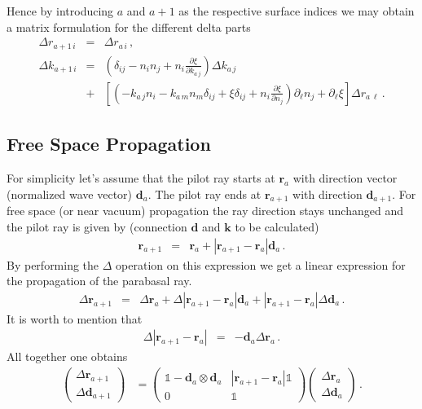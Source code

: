 \documentclass[12pt,a4paper,twoside,openright,BCOR10mm,headsepline,titlepage,abstracton,chapterprefix,final]{scrreprt}
\newcommand\Vector[1]{{\mathbf{#1}}}
\newcommand\wavenumber{k}
\begin{document}
Hence by introducing $a$ and $a+1$ as the respective surface indices we may obtain a matrix formulation for the different delta parts
\begin{eqnarray}
 \Delta r_{a+1\,i} &=& \Delta r_{a\,i}\,,\\
 \Delta \wavenumber_{a+1\,i} &=& 
   \left( \delta_{ij}  - n_i n_j + n_i \frac{\partial \xi}{\partial \wavenumber_{a\,j}}\right) \Delta\wavenumber_{a\,j} \nonumber\\
   &+&
   \left[
      \left(
     - \wavenumber_{a\,j}  n_i 
     - \wavenumber_{a\,m} n_m \delta_{ij}  
     + \xi \delta_{ij}
     + n_i \frac{\partial \xi}{\partial n_j}
    \right) \partial_\ell n_j + \partial_\ell \xi\right]\Delta r_{a\,\ell}\,.
\end{eqnarray}


\subsection{Free Space Propagation}
For simplicity let's assume that the pilot ray starts at $\Vector{r}_a$ with direction vector (normalized wave vector) $\Vector{d}_a$.
The pilot ray ends at $\Vector{r}_{a+1}$ with direction $\Vector{d}_{a+1}$. For free space (or near vacuum) propagation the ray direction
stays unchanged and the pilot ray is given by (connection $\Vector{d}$ and $\Vector{k}$ to be calculated)
\begin{eqnarray}
 \Vector{r}_{a+1} &=& \Vector{r}_a + |\Vector{r}_{a+1} - \Vector{r}_{a}| \Vector{d}_a\,.
\end{eqnarray}
By performing the $\Delta$ operation on this expression we get a linear expression for the propagation of the parabasal ray.
\begin{eqnarray}
 \Delta \Vector{r}_{a+1} &=& \Delta \Vector{r}_a + \Delta |\Vector{r}_{a+1} - \Vector{r}_{a}| \Vector{d}_a + |\Vector{r}_{a+1} - \Vector{r}_{a}| \Delta \Vector{d}_a\,.
\end{eqnarray}
It is worth to mention that
\begin{eqnarray}
 \Delta |\Vector{r}_{a+1} - \Vector{r}_{a}| &=& - \Vector{d}_a \Delta \Vector{r}_a\,.
\end{eqnarray}
All together one obtains 
\begin{eqnarray}
 \begin{pmatrix}
  \Delta \Vector{r}_{a+1} \\
  \Delta \Vector{d}_{a+1}
 \end{pmatrix}
  &=
 \begin{pmatrix}
    \mathds{1} - \Vector{d}_a \otimes \Vector{d}_a & |\Vector{r}_{a+1} - \Vector{r}_{a}|\mathds{1} \\
    0 & \mathds{1}				
 \end{pmatrix}
 \begin{pmatrix}
  \Delta \Vector{r}_{a} \\
  \Delta \Vector{d}_{a}
 \end{pmatrix}\,.
\end{eqnarray}
\end{document}

